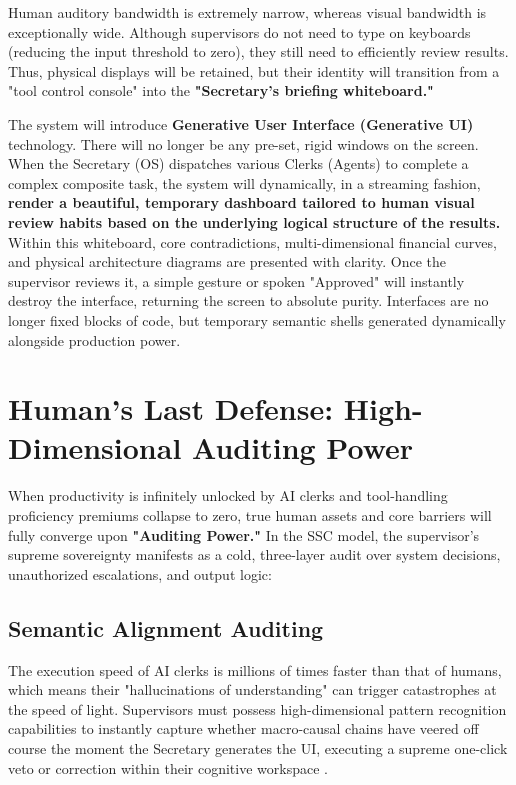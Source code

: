 \documentclass[11pt,a4paper]{article}
\begin{document}
Human auditory bandwidth is extremely narrow, whereas visual bandwidth is exceptionally wide. Although supervisors do not need to type on keyboards (reducing the input threshold to zero), they still need to efficiently review results. Thus, physical displays will be retained, but their identity will transition from a "tool control console" into the \textbf{"Secretary's briefing whiteboard."}

The system will introduce \textbf{Generative User Interface (Generative UI)} technology. There will no longer be any pre-set, rigid windows on the screen. When the Secretary (OS) dispatches various Clerks (Agents) to complete a complex composite task, the system will dynamically, in a streaming fashion, \textbf{render a beautiful, temporary dashboard tailored to human visual review habits based on the underlying logical structure of the results.} Within this whiteboard, core contradictions, multi-dimensional financial curves, and physical architecture diagrams are presented with clarity. Once the supervisor reviews it, a simple gesture or spoken "Approved" will instantly destroy the interface, returning the screen to absolute purity. Interfaces are no longer fixed blocks of code, but temporary semantic shells generated dynamically alongside production power.

\section{Human's Last Defense: High-Dimensional Auditing Power}

When productivity is infinitely unlocked by AI clerks and tool-handling proficiency premiums collapse to zero, true human assets and core barriers will fully converge upon \textbf{"Auditing Power."} In the SSC model, the supervisor's supreme sovereignty manifests as a cold, three-layer audit over system decisions, unauthorized escalations, and output logic:

\subsection{Semantic Alignment Auditing}

The execution speed of AI clerks is millions of times faster than that of humans, which means their "hallucinations of understanding" can trigger catastrophes at the speed of light. Supervisors must possess high-dimensional pattern recognition capabilities to instantly capture whether macro-causal chains have veered off course the moment the Secretary generates the UI, executing a supreme one-click veto or correction within their cognitive workspace \cite{amodei2016}.
\end{document}
